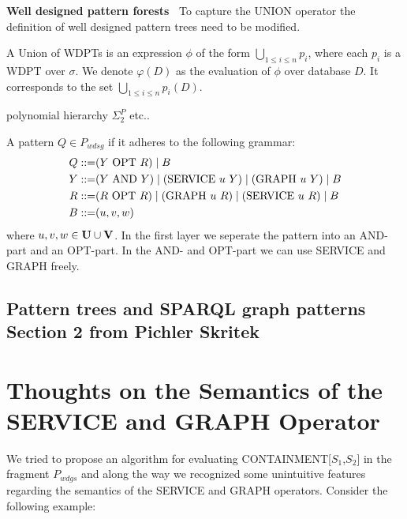 			\bigskip \noindent
			\textbf{Well designed pattern forests~\cite{barcelo2015efficient}}
			To capture the UNION operator the definition of well designed pattern trees
			need to be modified.  
			\begin{definition}
				A Union of WDPTs is an expression $\phi$ of the form $\bigcup_{1\leq i \leq n} p_i$, 
				where each $p_i$ is a WDPT over $\sigma$.
				We denote $\varphi(D)$ as the evaluation of $\phi$ over database $D$.
				It corresponds to the set $\bigcup_{1\leq i \leq n}p_i(D)$.

			\end{definition}

\begin{definition}
	polynomial hierarchy $\Sigma^P_2$ etc..
\end{definition}

\begin{definition}[$P_{wdsg}$]
	A pattern $Q \in P_{wdsg}$ if it adheres to the following grammar:
	\begin{align*}
		Q::= &  (Y \mbox{ OPT } R)  \mid B \\
		Y::= & (Y \mbox{ AND } Y) \mid (\mbox{SERVICE } u \ Y) \mid (\mbox{GRAPH } u \
		Y) \mid  B\\
		R::= &(R \mbox{ OPT } R) \mid (\mbox{GRAPH } u \ R) \mid (\mbox{SERVICE } u \ R) \mid B  \\
		B::= &(u,v,w)
	\end{align*}
	where	$u,v,w \in \mathbf{U} \cup \mathbf{V}$. In the first layer we seperate the pattern
	into an AND-part and an OPT-part. In the AND- and OPT-part we can use
	SERVICE and GRAPH freely.

\end{definition}

\subsection*{Pattern trees and SPARQL graph patterns
Section 2 from Pichler Skritek}

\section{Thoughts on the Semantics of the SERVICE and GRAPH Operator}

We tried to propose an algorithm for evaluating CONTAINMENT[$S_1$,$S_2$] in the
fragment $P_{wdgs}$ and
along the way we recognized some unintuitive features regarding the semantics of the
SERVICE and GRAPH operators. Consider the following example:


